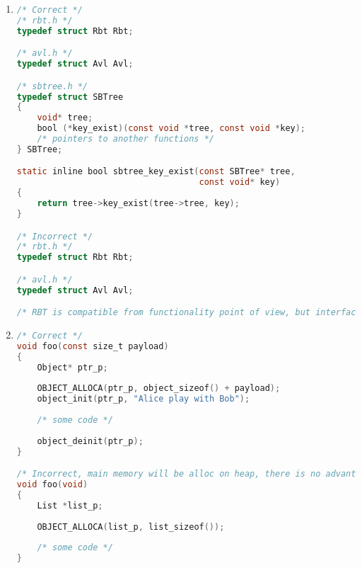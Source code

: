 \begin{enumerate}
\begin{lstlisting}[language=C,style=C99]
void sort(int *t, size_t len, cmp_f cmp);

/* Incorrect */
/* a < b -> a is before b */
void sort(int *t, size_t len);

/* a < b -> a is after b */
void sort_rev(int *t, size_t len); 
\end{lstlisting}

    \item
\begin{lstlisting}[language=C,style=C99]
/* Correct */
/* rbt.h */
typedef struct Rbt Rbt;

/* avl.h */
typedef struct Avl Avl;

/* sbtree.h */
typedef struct SBTree
{
    void* tree;
    bool (*key_exist)(const void *tree, const void *key);
    /* pointers to another functions */
} SBTree;

static inline bool sbtree_key_exist(const SBTree* tree,
                                    const void* key)
{
    return tree->key_exist(tree->tree, key);
}

/* Incorrect */
/* rbt.h */
typedef struct Rbt Rbt;

/* avl.h */
typedef struct Avl Avl;

/* RBT is compatible from functionality point of view, but interface is not created, this is incorrect */
\end{lstlisting}

    \item
\begin{lstlisting}[language=C,style=C99]
/* Correct */
void foo(const size_t payload)
{
    Object* ptr_p;
    
    OBJECT_ALLOCA(ptr_p, object_sizeof() + payload);
    object_init(ptr_p, "Alice play with Bob");
    
    /* some code */
    
    object_deinit(ptr_p);
}

/* Incorrect, main memory will be alloc on heap, there is no advantage to alloc list on stack, also by using special macro readability is decreased */
void foo(void)
{
    List *list_p;
    
    OBJECT_ALLOCA(list_p, list_sizeof());
    
    /* some code */
}
\end{lstlisting}
\end{enumerate}

